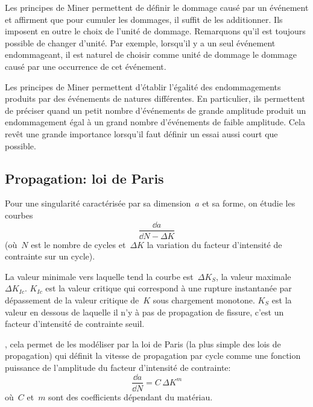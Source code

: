 \medskip
Les principes de Miner permettent de définir le dommage causé par un événement et affirment que pour cumuler les dommages, il suffit de les additionner. Ils imposent en outre le choix de l'unité de dommage. Remarquons qu'il est toujours possible de changer d'unité. Par exemple, lorsqu'il y a un seul événement endommageant, il est naturel de choisir comme unité de dommage le dommage causé par une occurrence de cet événement.

\medskip
Les principes de Miner permettent d'établir l'égalité des endommagements produits par des événements de natures différentes. En particulier, ils permettent de préciser quand un petit nombre d'événements de grande amplitude produit un endommagement égal à un grand nombre d'événements de faible amplitude. Cela revêt une grande importance lorsqu'il faut définir un essai aussi court que possible.


\medskip
\subsection{Propagation: loi de Paris}

\medskip
Pour une singularité caractérisée par sa dimension~$a$ et sa forme, on étudie les courbes
\begin{equation}\frac{\dd a}{\dd N - \Delta K}\end{equation} 
(où~$N$ est le nombre de cycles et~$\Delta K$ la variation du facteur d'intensité de contrainte sur un cycle).

\medskip
{} La valeur minimale vers laquelle tend la courbe est~$\Delta K_S$, la valeur maximale~$\Delta K_{Ic}$. $K_{Ic}$ est la valeur critique qui correspond à une rupture instantanée par dépassement de la valeur critique de~$K$ sous chargement monotone. $K_S$ est la valeur en dessous de laquelle il n'y à pas de propagation de fissure, c'est un facteur d'intensité de contrainte seuil.

\medskip
{}, cela permet de les modéliser par la loi de Paris (la plus simple des lois de propagation) qui définit la vitesse de propagation par cycle comme une fonction puissance de l'amplitude du facteur d'intensité de contrainte:
\begin{equation} \dfrac{\dd a}{\dd N} = C\,\Delta K^m \end{equation}
où~$C$ et~$m$ sont des coefficients dépendant du matériau.

